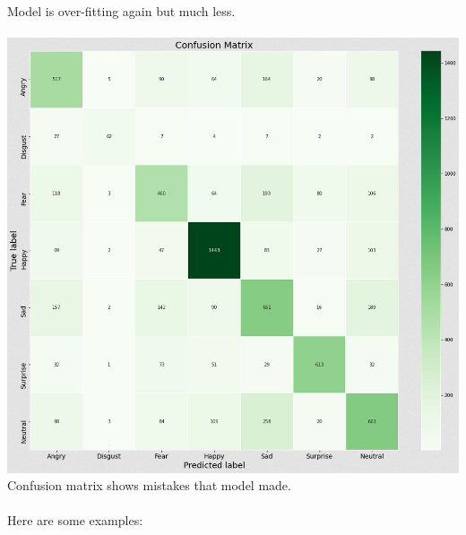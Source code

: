 Model is over-fitting again but much less.\\
\\
\includegraphics[scale=0.60]{images/modelTwo/matrixTwo.png}
Confusion matrix shows mistakes that model made.\\
\\
Here are some examples:
